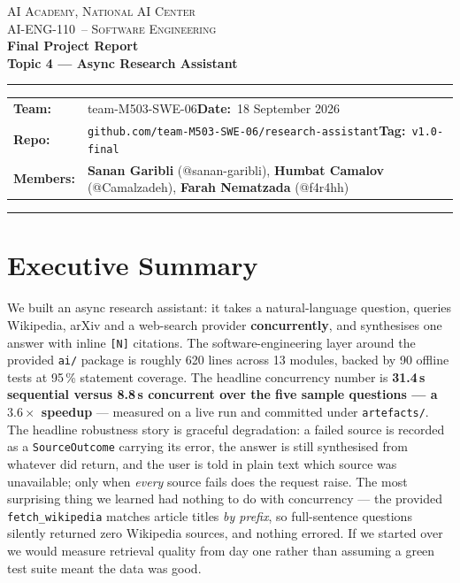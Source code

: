 \documentclass[11pt,a4paper]{article}
\newcommand{\teamname}{team-M503-SWE-06}
\newcommand{\topicchoice}{Topic 4 --- Async Research Assistant}
\newcommand{\member}[2]{\textbf{#1} (#2)}  %
\newcommand{\reportdate}{18 September 2026}
\newcommand{\repolink}{\texttt{github.com/team-M503-SWE-06/research-assistant}}
\newcommand{\coursecode}{AI-ENG-110}
\newcommand{\coursename}{Software Engineering}
\newcommand{\institution}{AI Academy, National AI Center}
\begin{document}
\begin{center}
{\small \textsc{\institution} \\[0.2em] \textsc{\coursecode\ -- \coursename}}\\[1.2em]
{\Large\bfseries\color{accent} Final Project Report}\\[0.3em]
{\LARGE\bfseries \topicchoice}\\[0.6em]
\rule{0.85\textwidth}{0.6pt}
\end{center}

\vspace{0.6em}
\begin{tabularx}{\textwidth}{@{}lX@{}}
\textbf{Team:} & \teamname \hfill \textbf{Date:}~\reportdate \\[3pt]
\textbf{Repo:} & \repolink \hfill \textbf{Tag:}~\texttt{v1.0-final} \\[3pt]
\textbf{Members:} & \member{Sanan Garibli}{@sanan-garibli},\quad
  \member{Humbat Camalov}{@Camalzadeh},\quad
  \member{Farah Nematzada}{@f4r4hh} \\
\end{tabularx}
\vspace{0.4em}\hrule\vspace{0.6em}

\section*{Executive Summary}

We built an async research assistant: it takes a natural-language question, queries Wikipedia,
arXiv and a web-search provider \textbf{concurrently}, and synthesises one answer with inline
\texttt{[N]} citations. The software-engineering layer around the provided \texttt{ai/} package is
roughly 620 lines across 13 modules, backed by 90 offline tests at 95\,\% statement coverage. The
headline concurrency number is \textbf{31.4\,s sequential versus 8.8\,s concurrent over the five
sample questions --- a $3.6\times$ speedup} --- measured on a live run and committed under
\texttt{artefacts/}. The headline robustness story is graceful degradation: a failed source is
recorded as a \texttt{SourceOutcome} carrying its error, the answer is still synthesised from
whatever did return, and the user is told in plain text which source was unavailable; only when
\emph{every} source fails does the request raise. The most surprising thing we learned had nothing
to do with concurrency --- the provided \texttt{fetch\_wikipedia} matches article titles \emph{by
prefix}, so full-sentence questions silently returned zero Wikipedia sources, and nothing errored.
If we started over we would measure retrieval quality from day one rather than assuming a green
test suite meant the data was good.
\end{document}
